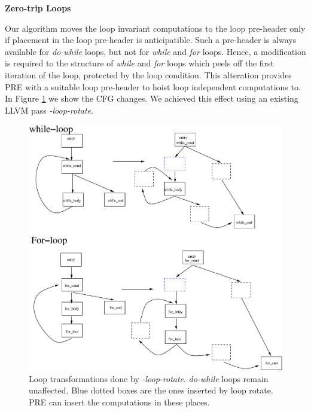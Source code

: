 \documentclass[10pt,twoside]{report}
\begin{document}
\begin{flushleft}
\textbf{\large{Zero-trip Loops}}
\end{flushleft}
Our algorithm moves the loop invariant
      computations to the loop pre-header only if placement in the loop pre-header is 
      anticipatible. Such a pre-header is always available for \emph{do-while} loops, 
      but not for \emph{while} and \emph{for} loops. Hence, a modification is required
      to the structure of \emph{while} and \emph{for} loops which peels off the first
      iteration of the loop, protected by the loop condition. This alteration provides 
      PRE with a suitable loop pre-header to hoist loop independent computations to.
      In Figure \ref{fig:5} we show the CFG changes. We achieved this effect using an 
      existing LLVM pass \emph{-loop-rotate}.

\begin{figure}[htbp]
  \begin{center}
     \includegraphics[scale=0.5]{Figs/5} 
  \end{center}
  \caption{Loop transformations done by \emph{-loop-rotate}. \emph{do-while}
    loops remain unaffected. Blue dotted boxes are the ones inserted by loop
      rotate. PRE can insert the computations in these places.}
  \label{fig:5} 
  \end{figure}
\end{document}
